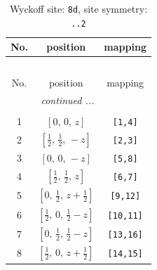 \documentclass[fleqn,8pt]{jsarticle}
\begin{document}
\begin{longtable}{ccc}
\caption{Wyckoff site: {\tt 8d}, site symmetry: {\tt ..2}}
 \\
 \hline \hline
No. & position & mapping \\ \hline \endfirsthead

\multicolumn{2}{l}{\tablename\ \thetable{}} \\
 \hline \hline
No. & position & mapping \\ \hline \endhead

 \hline \hline
\multicolumn{2}{r}{\footnotesize\it continued ...} \\ \endfoot

 \hline \hline
\multicolumn{2}{r}{} \\ \endlastfoot

1 & $\left[ 0,\, 0,\, z \right]$ & {\tt [1,4]} \\ \hline
2 & $\left[ \frac{1}{2},\, \frac{1}{2},\, - z \right]$ & {\tt [2,3]} \\ \hline
3 & $\left[ 0,\, 0,\, - z \right]$ & {\tt [5,8]} \\ \hline
4 & $\left[ \frac{1}{2},\, \frac{1}{2},\, z \right]$ & {\tt [6,7]} \\ \hline
5 & $\left[ 0,\, \frac{1}{2},\, z + \frac{1}{2} \right]$ & {\tt [9,12]} \\ \hline
6 & $\left[ \frac{1}{2},\, 0,\, \frac{1}{2} - z \right]$ & {\tt [10,11]} \\ \hline
7 & $\left[ 0,\, \frac{1}{2},\, \frac{1}{2} - z \right]$ & {\tt [13,16]} \\ \hline
8 & $\left[ \frac{1}{2},\, 0,\, z + \frac{1}{2} \right]$ & {\tt [14,15]} \\
\end{longtable}
\renewcommand{\arraystretch}{1.2}
\end{document}
